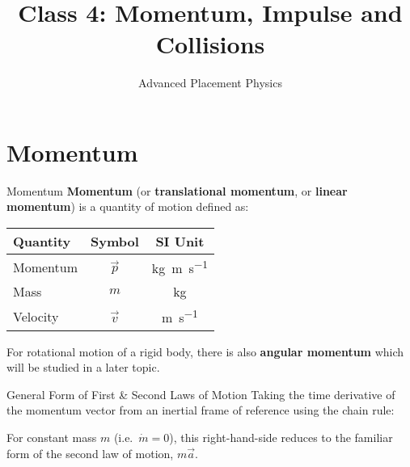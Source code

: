 \documentclass[12pt,compress,aspectratio=169]{beamer}
\title{Class 4: Momentum, Impulse and Collisions}
\subtitle{Advanced Placement Physics}
\begin{document}
\begin{frame}
  \maketitle
\end{frame}



\section{Momentum}

\begin{frame}{Momentum}
  \textbf{Momentum} (or \textbf{translational momentum}, or \textbf{linear
    momentum}) is a quantity of motion defined as:

  \begin{center}
    \begin{tabular}{l|c|c}
      \rowcolor{pink}
      \textbf{Quantity}   & \textbf{Symbol} & \textbf{SI Unit} \\ \hline
      Momentum  & $\vec p$ & \si{\kilo\gram\metre\per\second} \\
      Mass      & $m$     & \si{\kilo\gram} \\
      Velocity  & $\vec v$ & \si{\metre\per\second}
    \end{tabular}
  \end{center}
  For rotational motion of a rigid body, there is also \textbf{angular momentum}
  which will be studied in a later topic.
\end{frame}



\begin{frame}{General Form of First \& Second Laws of Motion}
  Taking the time derivative of the momentum vector from an inertial frame of
  reference using the chain rule:


  For constant mass $m$ (i.e.\ $\dot m=0$), this right-hand-side reduces to the
  familiar form of the second law of motion, $m\vec a$.
\end{frame}
\end{document}
